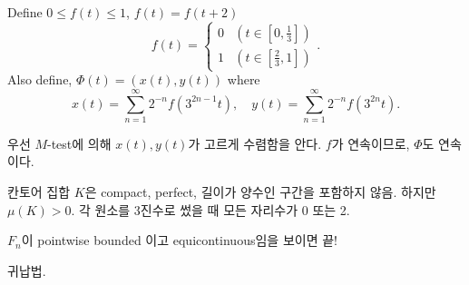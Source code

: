   Define \(0\leq f(t) \leq 1\), \(f(t) = f(t + 2)\)
\[
    f(t) = \begin{cases}
        0 & (t \in [0, \frac{1}{3}]) \\
        1 & (t \in [\frac{2}{3}, 1])
    \end{cases}.
\]
Also define, \(\Phi(t) = (x(t), y(t))\) where
\[
    x(t) = \sum_{n=1}^\infty 2^{-n} f(3^{2n-1} t), \quad y(t) = \sum_{n=1}^\infty 2^{-n} f(3^{2n} t).
\]

우선 \(M\)-test에 의해 \(x(t), y(t)\)가 고르게 수렴함을 안다. \(f\)가 연속이므로, \(\Phi\)도 연속이다.

칸토어 집합 \(K\)은 compact, perfect, 길이가 양수인 구간을 포함하지 않음. 하지만 \(\mu(K) > 0\). 각 원소를 3진수로 썼을 때 모든 자리수가 0 또는 2.

 \(F_n\)이 pointwise bounded 이고 equicontinuous임을 보이면 끝!

 귀납법.

\pagebreak
